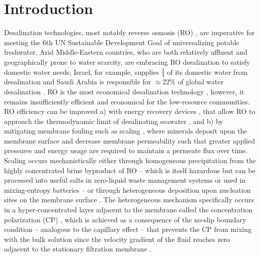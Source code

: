\label{ROSSpy_chapter}

\section{Introduction}
Desalination technologies, most notably reverse osmosis (RO) \cite{Malaeb2011ReverseReview}, are imperative for meeting the 6th UN Sustainable Development Goal \cite{Jones2018TheOutlook} of universalizing potable freshwater. Arid Middle-Eastern countries, who are both relatively affluent and geographically prone to water scarcity, are embracing RO desalination to satisfy domestic water needs; Israel, for example, supplies $\frac{3}{4}$ of its domestic water from desalination \cite{Shemer2017SustainableImpact} and Saudi Arabia is responsible for $\approx 22\%$ of global water desalination \cite{Council2021WaterPrivatization}. RO is the most economical desalination technology \cite{Karime2008ROPlant,Hafez2003EconomicsStudy}, however, it remains insufficiently efficient and economical for the low-resource communities. RO efficiency can be improved \cite{Elimelech2011TheEnvironment,Semiat2008EnergyProcesses} a) with energy recovery devices \cite{Amy2017Membrane-basedProspects}, that allow RO to approach the thermodynamic limit of desalinating seawater \cite{Zarzo2018DesalinationFuture}, and b) by mitigating membrane fouling such as scaling \cite{Warsinger2015ScalingReview,Khan2013SourceSea,Tang2014FoulingPlant,Shmulevsky2017AnalysisMembranes}, where minerals deposit upon the membrane surface and decrease membrane permeability such that greater applied pressures and energy usage are required to maintain a permeate flux over time. Scaling occurs mechanistically either through homogeneous precipitation from the highly concentrated brine byproduct of RO \cite{VanWagner2009EffectPerformance,Belfer1998SurfaceMembranes} -- which is itself hazardous \cite{Fernandez-torquemada2012DispersionPlants,Clemens1955ToxicityWells,Allen1989ApparatusBrine,Munn1989EffectCrops} but can be processed into useful salts \cite{Allen1954ProcessBrine,Fenton1992DesalinationWells} in zero-liquid waste management systems \cite{Jeppesen2009MetalConcentrate,Mavukkandy2019BrineGeneration} or used in mixing-entropy batteries \cite{Ye2019Charge-FreeMaterials} -- or through heterogeneous deposition upon nucleation sites on the membrane surface \cite{Karabelas2014IncipientChannels,Warsinger2018InorganicOsmosis}. The heterogeneous mechanism specifically occurs in a hyper-concentrated layer adjacent to the membrane called the concentration polarization (CP)   \cite{McCutcheon2006InfluenceOsmosis,Murthy1997EstimationModel,Gruber2011ComputationalSystems,Sablani2001ConcentrationReview,Zydney1997StagnantSystems,Li2016Three-dimensionalChannel}, which is achieved as a consequence of the no-slip boundary condition -- analogous to the capillary effect -- that prevents the CP from mixing with the bulk solution since the velocity gradient of the fluid reaches zero adjacent to the stationary filtration membrane \cite{Rapp2017Fluids}. 

